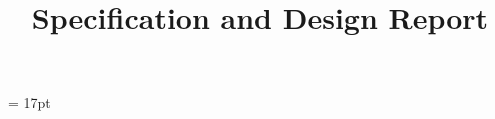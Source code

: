 \documentclass[11pt,times,oneside,openright,hardcopy]{eeereport}
\title{Specification and Design Report}
\subtitle{}
\begin{document}
\baselineskip = 17pt
\begin{titlepage}

\newpage
\thispagestyle{empty}
\end{titlepage}

\frontmatter

	


\end{document}
